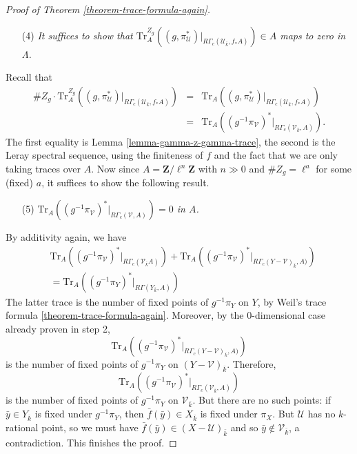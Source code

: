 \begin{proof}[Proof of Theorem \ref{theorem-trace-formula-again}]
\begin{enumerate}
\item[(4)]
{\it
It suffices to show that $\text{Tr}_A^{Z_g}\left((g,
\pi_\mathcal{U}^*)\big|_{R\Gamma_c(\mathcal{U}_{\bar k}, f_*A)}\right) \in A$
maps to zero in $\Lambda$.
}
\end{enumerate}
Recall that
\begin{eqnarray*}
\# Z_g \cdot \text{Tr}_A^{Z_g}\left((g,
\pi_\mathcal{U}^*)\big|_{R\Gamma_c(\mathcal{U}_{\bar k}, f_*A)}\right)
& = & \text{Tr}_A\left((g, \pi_\mathcal{U}^*)\big|_{R\Gamma_c(\mathcal{U}_{\bar
k}, f_*A)}\right)\\
& = &
\text{Tr}_A\left((g^{-1}\pi_\mathcal{V})^*\big|_{R\Gamma_c(\mathcal{V}_{\bar
k}, A)}\right).
\end{eqnarray*}
The first equality is
Lemma \ref{lemma-gamma-z-gamma-trace},
the second is the Leray
spectral sequence, using the finiteness of $f$ and the fact that we are only
taking traces over $A$. Now since $A=\mathbf{Z}/\ell^n\mathbf{Z}$ with
$n \gg 0$ and $\# Z_g = \ell^a$ for some (fixed) $a$,
it suffices to show the following result.
\begin{enumerate}
\item[(5)]
{\it $\text{Tr}_A\left((g^{-1}\pi_\mathcal{V})^*\big|_{R\Gamma_c(\mathcal{V},
A)}\right) = 0$ in $A$.}
\end{enumerate}
By additivity again, we have
\begin{eqnarray*}
&
\text{Tr}_A
\left(
(g^{-1}\pi_\mathcal{V})^*\big|_{R\Gamma_c(\mathcal{V}_{\bar k} A)}
\right)
+
\text{Tr}_A
\left(
(g^{-1}\pi_\mathcal{V})^*\big|_{R\Gamma_c(Y-\mathcal {V})_{\bar k}, A)}
\right) \\
&
=
\text{Tr}_A
\left(
(g^{-1}\pi_Y)^*\big|_{R\Gamma(Y_{\bar k}, A)}
\right)
\end{eqnarray*}
The latter trace is the number of fixed points of $g^{-1}\pi_Y$ on $Y$, by
Weil's trace formula \ref{theorem-trace-formula-again}. Moreover, by the
0-dimensional case already proven in step 2,
$$
\text{Tr}_A\left((g^{-1}\pi_\mathcal{V})^*\big|_{R\Gamma_c(Y-\mathcal{V})_{\bar
k}, A)}\right)
$$
is the number of fixed points of $g^{-1}\pi_Y$ on $(Y-\mathcal{V})_{\bar k}$.
Therefore,
$$
\text{Tr}_A\left((g^{-1}\pi_\mathcal{V})^*\big|_{R\Gamma_c(\mathcal{V}_{\bar
k}, A)}\right)
$$
is the number of fixed points of $g^{-1}\pi_Y$ on $\mathcal{V}_{\bar k}$. But
there are no such points: if $\bar y\in Y_{\bar k}$ is fixed under
$g^{-1}\pi_Y$, then $\bar f(\bar y) \in X_{\bar k}$ is fixed under $\pi_X$. But
$\mathcal{U}$ has no $k$-rational point, so we must have $\bar f(\bar y)\in
(X-\mathcal{U})_{\bar k}$ and so $\bar y\notin \mathcal{V}_{\bar k}$, a
contradiction.
This finishes the proof.
\end{proof}


